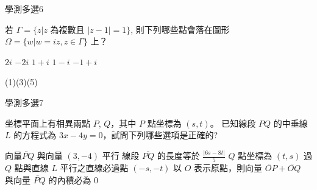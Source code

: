 \begin{QUESTIONS}
    \begin{QUESTION}
        \begin{ExamInfo}{96}{學測}{多選}{6}
        \end{ExamInfo}
        \begin{ExamAnsRateInfo}{19}{35}{12}{10}
        \end{ExamAnsRateInfo}
        \begin{QBODY}
            若 $\Gamma = \{ z|z$ 為複數且 $|z - 1|=1\}$, 則下列哪些點會落在圖形 $\Omega =\{w|w=iz,z \in \Gamma \}$ 上？  
			\begin{QOPS} 
				\QOP $2i$    \QOP $-2i$ 
				\QOP $1+i$ 
				\QOP $1-i$ 
				\QOP $-1+i$
			\end{QOPS}
        \end{QBODY}
        \begin{QFROMS}
        \end{QFROMS}
        \begin{QTAGS}\end{QTAGS}
        \begin{QANS}
            (1)(3)(5)
        \end{QANS}
        \begin{QSOLLIST}
        \end{QSOLLIST}
        \begin{QEMPTYSPACE}
        \end{QEMPTYSPACE}
    \end{QUESTION}
    \begin{QUESTION}
        \begin{ExamInfo}{96}{學測}{多選}{7}
        \end{ExamInfo}
        \begin{ExamAnsRateInfo}{25}{42}{20}{13}
        \end{ExamAnsRateInfo}
        \begin{QBODY}
            坐標平面上有相異兩點 $P$, $Q$，其中 $P$ 點坐標為 $(s,t)$。
			已知線段 $PQ$ 的中垂線 $L$ 的方程式為 $3x - 4 y = 0$，試問下列哪些選項是正確的? 
    		\begin{QOPS} 
    			\QOP 向量$\lvec{PQ}$ 與向量 $(3,-4)$  平行 
    			\QOP 線段 $\overline{PQ}$ 的長度等於 $\frac{|6s-8t|}{5}$ 
    			\QOP $Q$ 點坐標為 $(t,s)$ 
    			\QOP 過 $Q$ 點與直線 $L$ 平行之直線必過點 $(-s,-t)$ 
    			\QOP 以 $O$ 表示原點，則向量 $\lvec{OP}+\lvec{OQ}$ 與向量 $\lvec{PQ}$ 的內積必為 0 
    		\end{QOPS}
        \end{QBODY}

\end{QUESTION}
\end{QUESTIONS}
